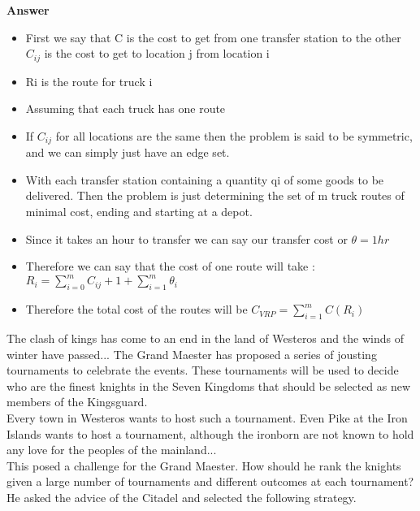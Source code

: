 \documentclass{article}
\begin{document}
\textbf{ Answer }
\vspace{0.1in}
\begin{adjustwidth}{1.8em}{0pt}
\begin{itemize}
\item First we say that C is the cost to get from one transfer station to the other $C_{ij}$ is the cost to get to location j from location i
\item Ri is the route for truck i
\item Assuming that each truck has one route
\item If $C_{ij}$ for all locations are the same then the problem is said to be symmetric, and we can simply just have an edge set.
\item With each transfer station containing a quantity qi of some goods to be delivered. Then the problem is just determining the set of m truck routes of minimal cost, ending and starting at a depot.
\item Since it takes an hour to transfer we can say our transfer cost or $\theta = 1hr$
\item Therefore we can say that the cost of one route will take : 
$R_{i} = \sum _{i=0}^{m} C_{ij} + 1 + \sum _{i=1}^{m} \theta _{i}$
\item Therefore the total cost of the routes will be
$C_{VRP} = \sum _{i=1}^{m} C(R_{i})$
\end{itemize}
\end{adjustwidth}

\vspace{0.1in}

 The clash of kings has come to an end in
the land of Westeros and the winds of winter have passed... The Grand
Maester has proposed a series of jousting tournaments to celebrate the
events. These tournaments will be used to decide who are the finest
knights in the Seven Kingdoms that should be selected as new members
of the Kingsguard.\\

\noindent Every town in Westeros wants to host such a tournament. Even
Pike at the Iron Islands wants to host a tournament, although the
ironborn are not known to hold any love for the peoples of the
mainland...\\

\noindent This posed a challenge for the Grand Maester. How should he
rank the knights given a large number of tournaments and different
outcomes at each tournament? He asked the advice of the Citadel and
selected the following strategy.\\
\end{document}
